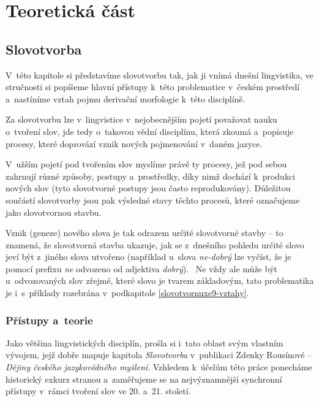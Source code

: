 \part{Teoretická část}

\hypertarget{slovotvorba}{%
\chapter{Slovotvorba}\label{slovotvorba}}

V~této kapitole si představíme slovotvorbu tak, jak ji vnímá dnešní
lingvistika, ve stručnosti si popíšeme hlavní přístupy k~této
problematice v~českém prostředí a~nastíníme vztah pojmu derivační
morfologie k~této disciplíně.

Za slovotvorbu lze v~lingvistice v~nejobecnějším pojetí považovat nauku
o~tvoření slov, jde tedy o~takovou vědní disciplínu, která zkoumá
a~popisuje procesy, které doprovází vznik nových pojmenování v~daném
jazyce.

V~užším pojetí pod tvořením slov myslíme právě ty procesy, jež pod sebou
zahrnují různé způsoby, postupy a~prostředky, díky nimž dochází
k~produkci nových slov (tyto slovotvorné postupy jsou často
reprodukovány). Důležitou součástí slovotvorby jsou pak výsledné stavy
těchto procesů, které označujeme jako slovotvornou stavbu.
\parencite[92]{dokulil00}

Vznik (geneze) nového slova je tak odrazem určité slovotvorné stavby --
to znamená, že slovotvorná stavba ukazuje, jak se z~dnešního pohledu
určité slovo jeví být z~jiného slova utvořeno (například u~slova
\emph{ne-dobrý} lze vyčíst, že je pomocí prefixu \emph{ne} odvozeno od
adjektiva \emph{dobrý}).~\parencite[92--93]{dokulil00} Ne vždy ale může
být u~odvozovaných slov zřejmé, které slovo je tvarem základovým, tato
problematika je i~s~příklady rozebrána v~podkapitole
\ref{slovotvornuxe9-vztahy}.

\hypertarget{pux159uxedstupy-a-teorie}{%
\section{Přístupy a~teorie}\label{pux159uxedstupy-a-teorie}}

Jako většina lingvistických disciplín, prošla si i~tato oblast svým
vlastním vývojem, jejž dobře mapuje kapitola \emph{Slovotvorba}
v~publikaci Zdenky Rousínové -- \emph{Dějiny českého jazykovědného
myšlení}. Vzhledem k~účelům této práce ponecháme historický exkurz
stranou a~zaměřujeme se na nejvýznamnější synchronní přístupy v~rámci
tvoření slov ve 20. a~21. století.

